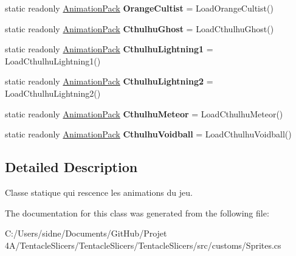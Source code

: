 \begin{DoxyCompactItemize}
static readonly \hyperlink{class_tentacle_slicers_1_1graphics_1_1_animation_pack}{Animation\+Pack} {\bfseries Orange\+Cultist} = Load\+Orange\+Cultist()
\item 
\mbox{\label{class_tentacle_slicers_1_1customs_1_1_sprites_a53dbba7cc4bdf018257c5da5a16a9789}} 
static readonly \hyperlink{class_tentacle_slicers_1_1graphics_1_1_animation_pack}{Animation\+Pack} {\bfseries Cthulhu\+Ghost} = Load\+Cthulhu\+Ghost()
\item 
\mbox{\label{class_tentacle_slicers_1_1customs_1_1_sprites_a93436d710b301f58b9f278a503bc102c}} 
static readonly \hyperlink{class_tentacle_slicers_1_1graphics_1_1_animation_pack}{Animation\+Pack} {\bfseries Cthulhu\+Lightning1} = Load\+Cthulhu\+Lightning1()
\item 
\mbox{\label{class_tentacle_slicers_1_1customs_1_1_sprites_a726cc87d7c73e98410c83b722d6a5b61}} 
static readonly \hyperlink{class_tentacle_slicers_1_1graphics_1_1_animation_pack}{Animation\+Pack} {\bfseries Cthulhu\+Lightning2} = Load\+Cthulhu\+Lightning2()
\item 
\mbox{\label{class_tentacle_slicers_1_1customs_1_1_sprites_a10760ea2f71cc5cfbfcaddd3ad887c17}} 
static readonly \hyperlink{class_tentacle_slicers_1_1graphics_1_1_animation_pack}{Animation\+Pack} {\bfseries Cthulhu\+Meteor} = Load\+Cthulhu\+Meteor()
\item 
\mbox{\label{class_tentacle_slicers_1_1customs_1_1_sprites_a0cdee68908e48911d0f49a87fabdba5d}} 
static readonly \hyperlink{class_tentacle_slicers_1_1graphics_1_1_animation_pack}{Animation\+Pack} {\bfseries Cthulhu\+Voidball} = Load\+Cthulhu\+Voidball()
\end{DoxyCompactItemize}


\subsection{Detailed Description}
Classe statique qui rescence les animations du jeu. 



The documentation for this class was generated from the following file\+:\begin{DoxyCompactItemize}
\item 
C\+:/\+Users/sidne/\+Documents/\+Git\+Hub/\+Projet 4\+A/\+Tentacle\+Slicers/\+Tentacle\+Slicers/\+Tentacle\+Slicers/src/customs/Sprites.\+cs\end{DoxyCompactItemize}
